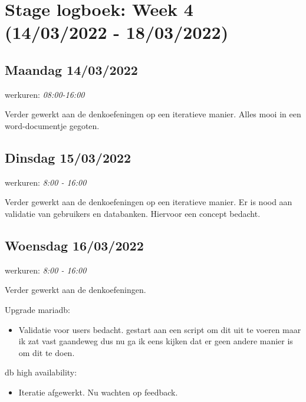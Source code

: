 
\hypertarget{stage-logboek-week-4-14032022---18032022}{%
\section{Stage logboek: Week 4 (14/03/2022 -
18/03/2022)}\label{stage-logboek-week-4-14032022---18032022}}

\hypertarget{maandag-14032022}{%
\subsection{Maandag 14/03/2022}\label{maandag-14032022}}

werkuren: \emph{08:00-16:00}

Verder gewerkt aan de denkoefeningen op een iteratieve manier. Alles
mooi in een word-documentje gegoten.

\hypertarget{dinsdag-15032022}{%
\subsection{Dinsdag 15/03/2022}\label{dinsdag-15032022}}

werkuren: \emph{8:00 - 16:00}

Verder gewerkt aan de denkoefeningen op een iteratieve manier. Er is
nood aan validatie van gebruikers en databanken. Hiervoor een concept
bedacht.

\hypertarget{woensdag-16032022}{%
\subsection{Woensdag 16/03/2022}\label{woensdag-16032022}}

werkuren: \emph{8:00 - 16:00}

Verder gewerkt aan de denkoefeningen.

Upgrade mariadb:

\begin{itemize}
\tightlist
\item
  Validatie voor users bedacht. gestart aan een script om dit uit te
  voeren maar ik zat vast gaandeweg dus nu ga ik eens kijken dat er geen
  andere manier is om dit te doen.
\end{itemize}

db high availability:

\begin{itemize}
\tightlist
\item
  Iteratie afgewerkt. Nu wachten op feedback.
\end{itemize}

